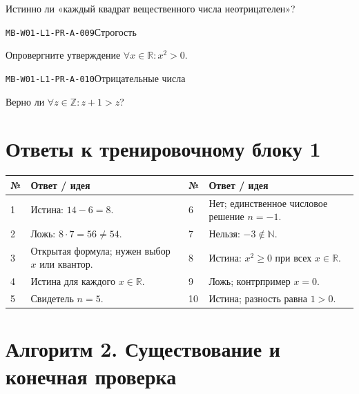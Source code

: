 \documentclass[11pt,a4paper,openany]{book}
\newcommand{\muid}[1]{\texttt{\footnotesize #1}}
\renewcommand{\arraystretch}{1.38}
\begin{document}
Истинно ли «каждый квадрат вещественного числа неотрицателен»?\par\medskip

\noindent\hypertarget{MB-W01-L1-PR-A-009}{}\muid{MB-W01-L1-PR-A-009}\quad Строгость\par

Опровергните утверждение $\forall x\in\mathbb R\colon x^2>0$.\par\medskip

\noindent\hypertarget{MB-W01-L1-PR-A-010}{}\muid{MB-W01-L1-PR-A-010}\quad Отрицательные числа\par

Верно ли $\forall z\in\mathbb Z\colon z+1>z$?\par\medskip

\clearpage\section*{Ответы к тренировочному блоку 1}


\begingroup\footnotesize\renewcommand{\arraystretch}{1.45}

\begin{tabularx}{\textwidth}{@{}p{10mm}X p{10mm}X@{}}\toprule № & Ответ / идея & № & Ответ / идея\\\midrule

1 & Истина: $14-6=8$. & 6 & Нет; единственное числовое решение $n=-1$.\\

2 & Ложь: $8\cdot7=56\ne54$. & 7 & Нельзя: $-3\notin\mathbb N$.\\

3 & Открытая формула; нужен выбор $x$ или квантор. & 8 & Истина: $x^2\ge0$ при всех $x\in\mathbb R$.\\

4 & Истина для каждого $x\in\mathbb R$. & 9 & Ложь; контрпример $x=0$.\\

5 & Свидетель $n=5$. & 10 & Истина; разность равна $1>0$.\\

\bottomrule\end{tabularx}\endgroup

\clearpage{}

\section*{Алгоритм 2. Существование и конечная проверка}
\end{document}
